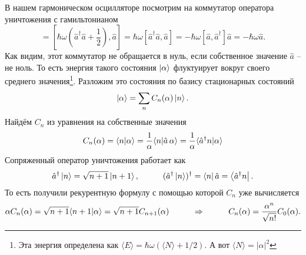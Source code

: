 В нашем гармоническом осцилляторе посмотрим на коммутатор оператора уничтожения с гамильтонианом
\begin{equation*}
	[\hat{H}, \hat{a}]
	= 
	[\hbar \omega \left(\hat{a}^\dagger \hat{a} + \frac{1}{2}\right) , \hat{a}]
	=
	\hbar \omega [\hat{a}^\dagger \hat{a}, \hat{a}] = - \hbar \omega [ \hat{a}, \hat{a}^\dagger] \hat{a} = - \hbar \omega \hat{a}.
\end{equation*}
Как видим, этот коммутатор не обращается в нуль, если собственное значение $\hat{a}$ -- не ноль. То есть энергия такого состояния $\left| \alpha \right\rangle$ флуктуирует вокруг своего среднего значения\footnote{Эта энергия определена как
$\langle E \rangle = \hbar \omega (\langle N \rangle + 1/2).$ А вот $\langle N \rangle = |\alpha|^2$}. Разложим это состояния по базису стационарных состояний
\begin{equation*}
	\left| \alpha \right\rangle = \sum_n C_n (\alpha) \left| n \right\rangle.
\end{equation*}
Найдём $C_n$ из уравнения на собственные значения
\begin{equation*}
	C_n(\alpha) = \bk{n}{\alpha} = \frac{1}{\alpha}\bk{n}{\hat{a}\, \alpha} = \frac{1}{\alpha} \bk{\hat{a}^\dagger n}{\alpha}
\end{equation*}
Сопряженный оператор уничтожения работает как
\begin{equation*}
	\hat{a}^\dagger \left| n \right\rangle = \sqrt{n+1} \left| n+1 \right\rangle, 
	\hspace{1 cm}
	(\hat{a}^\dagger \left| n \right\rangle)^\dagger = \left\langle n \right| \hat{a} = \left\langle \hat{a}^\dagger n \right|.
\end{equation*}
То есть получили рекурентную формулу с помощью которой $C_n$ уже вычисляется
\begin{equation*}
	\alpha C_n(\alpha) = \sqrt{n+1} \bk{n+1}{\alpha} = \sqrt{n+1} C_{n+1}(\alpha)
	\hspace{1 cm}
	\Rightarrow
	\hspace{1 cm}
	C_n(\alpha) = \frac{\alpha^n}{\sqrt{n!}} C_0(\alpha).
\end{equation*}

